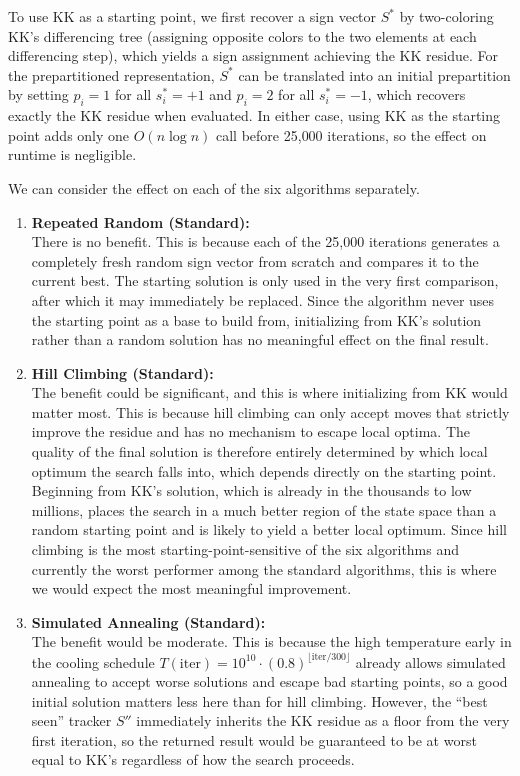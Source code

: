 \documentclass[11pt]{article}
\begin{document}
To use KK as a starting point, we first recover a sign vector $S^*$ by two-coloring KK's differencing tree (assigning opposite colors to the two elements at each differencing step), which yields a sign assignment achieving the KK residue. For the prepartitioned representation, $S^*$ can be translated into an initial prepartition by setting $p_i = 1$ for all $s_i^* = +1$ and $p_i = 2$ for all $s_i^* = -1$, which recovers exactly the KK residue when evaluated. In either case, using KK as the starting point adds only one $O(n \log n)$ call before 25{,}000 iterations, so the effect on runtime is negligible.

We can consider the effect on each of the six algorithms separately.

\begin{enumerate}
    \item \textbf{Repeated Random (Standard):} \\
    There is no benefit. This is because each of the 25{,}000 iterations generates a completely fresh random sign vector from scratch and compares it to the current best. The starting solution is only used in the very first comparison, after which it may immediately be replaced. Since the algorithm never uses the starting point as a base to build from, initializing from KK's solution rather than a random solution has no meaningful effect on the final result.

    \item \textbf{Hill Climbing (Standard):} \\
    The benefit could be significant, and this is where initializing from KK would matter most. This is because hill climbing can only accept moves that strictly improve the residue and has no mechanism to escape local optima. The quality of the final solution is therefore entirely determined by which local optimum the search falls into, which depends directly on the starting point. Beginning from KK's solution, which is already in the thousands to low millions, places the search in a much better region of the state space than a random starting point and is likely to yield a better local optimum. Since hill climbing is the most starting-point-sensitive of the six algorithms and currently the worst performer among the standard algorithms, this is where we would expect the most meaningful improvement.

    \item \textbf{Simulated Annealing (Standard):} \\
    The benefit would be moderate. This is because the high temperature early in the cooling schedule $T(\text{iter}) = 10^{10} \cdot (0.8)^{\lfloor \text{iter}/300 \rfloor}$ already allows simulated annealing to accept worse solutions and escape bad starting points, so a good initial solution matters less here than for hill climbing. However, the ``best seen'' tracker $S''$ immediately inherits the KK residue as a floor from the very first iteration, so the returned result would be guaranteed to be at worst equal to KK's regardless of how the search proceeds.


\end{enumerate}
\end{document}
